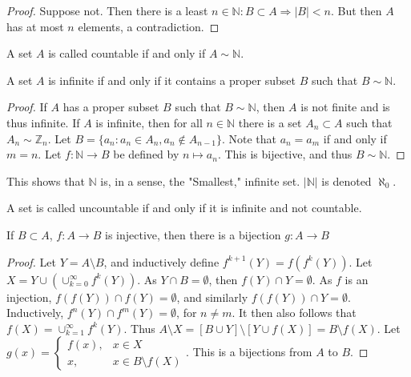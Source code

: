 \documentclass[crop=false,class=article,oneside]{standalone}
\begin{document}
            \begin{proof}
            Suppose not. Then there is a least $n\in \mathbb{N}:B\subset A\Rightarrow |B|<n$. But then $A$ has at most $n$ elements, a contradiction.
            \end{proof}
            \begin{definition}
            A set $A$ is called countable if and only if $A\sim \mathbb{N}$.
            \end{definition}
            \begin{theorem}
            A set $A$ is infinite if and only if it contains a proper subset $B$ such that $B\sim \mathbb{N}$.
            \end{theorem}
            \begin{proof}
            If $A$ has a proper subset $B$ such that $B\sim \mathbb{N}$, then $A$ is not finite and is thus infinite. If $A$ is infinite, then for all $n\in \mathbb{N}$ there is a set $A_n\subset A$ such that $A_n \sim \mathbb{Z}_n$. Let $B = \{a_n: a_n \in A_n, a_n \notin A_{n-1}\}$. Note that $a_{n} = a_{m}$ if and only if $m= n$. Let $f:\mathbb{N} \rightarrow B$ be defined by $n\mapsto a_n$. This is bijective, and thus $B\sim \mathbb{N}$.
            \end{proof}
            \begin{remark}
            This shows that $\mathbb{N}$ is, in a sense, the "Smallest," infinite set. $|\mathbb{N}|$ is denoted $\aleph_0$.
            \end{remark}
            \begin{definition}
            A set is called uncountable if and only if it is infinite and not countable.
            \end{definition}
            \begin{lemma}
            If $B\subset A$, $f:A\rightarrow B$ is injective, then there is a bijection $g:A\rightarrow B$
            \end{lemma}
            \begin{proof}
            Let $Y = A\setminus B$, and inductively define $f^{k+1}(Y) = f(f^{k}(Y))$. Let $X = Y\cup (\cup_{k=0}^{\infty} f^{k}(Y))$. As $Y\cap B = \emptyset$, then $f(Y)\cap Y= \emptyset$. As $f$ is an injection, $f(f(Y))\cap f(Y)=\emptyset$, and similarly $f(f(Y))\cap Y = \emptyset$. Inductively, $f^{n}(Y)\cap f^{m}(Y) = \emptyset$, for $n\ne m$. It then also follows that $f(X) = \cup_{k=1}^{\infty} f^{k}(Y)$. Thus $A\setminus X = [B\cup Y]\setminus [Y\cup f(X)] = B\setminus f(X)$. Let $g(x) = \begin{cases} f(x), & x\in X \\ x, & x \in B\setminus f(X)\end{cases}$. This is a bijections from $A$ to $B$.
            \end{proof}
\end{document}
